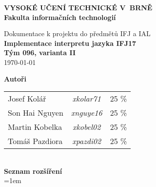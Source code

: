 \begin{titlepage}
    \centering

    {\fontsize{20pt}{15pt}\bfseries
    VYSOKÉ UČENÍ TECHNICKÉ V~BRNĚ\\
    \vspace{8pt}
    Fakulta informačních technologií
    }

    \vspace*{64pt}

    
    \vspace*{22pt}

    {\Large Dokumentace k projektu do předmětů IFJ a IAL\\}
    \vspace*{4pt}
    {\LARGE \bfseries Implementace interpretu jazyka IFJ17\\}
    \vspace*{62pt}
    {\Large \bfseries Tým 096, varianta II\\}
    \vspace*{42pt}
    {\Large \today}

    \vspace*{64pt}
    {\Large \bfseries Autoři\\}
    \vspace*{8pt}
    \begin{tabular}{ l c r }
        Josef Kolář & \textit{xkolar71} & 25 \% \\
        Son Hai Nguyen & \textit{xnguye16} & 25 \% \\
        Martin Kobelka & \textit{xkobel02} & 25 \% \\
        Tomáš Pazdiora & \textit{xpazdi02} & 25 \% \\
    \end{tabular}\\
    \vspace*{32pt}
    {\Large \bfseries Seznam rozšíření\\}
    \vspace*{8pt}
    {\spaceskip=1em }\\ %
    \vspace*{32pt}

\end{titlepage}
